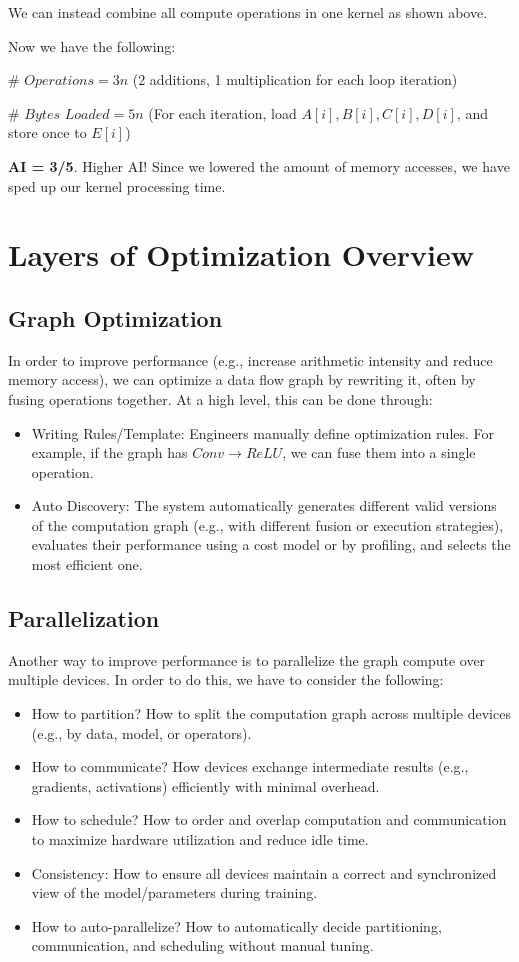 \documentclass[twoside]{article}
\begin{document}
We can instead combine all compute operations in one kernel as shown above. 

Now we have the following:

$\#$ $Operations = 3n$ (2 additions, 1 multiplication for each loop iteration) 

$\#$ $Bytes$ $Loaded = 5n$ (For each iteration, load $A[i], B[i], C[i], D[i]$, and store once to $E[i]$) 

\textbf{AI = 3/5}. Higher AI! Since we lowered the amount of memory accesses, we have sped up our kernel processing time.

\section{Layers of Optimization Overview}


\subsection{Graph Optimization}
In order to improve performance (e.g., increase arithmetic intensity and reduce memory access), we can optimize a data flow graph by rewriting it, often by fusing operations together. At a high level, this can be done through:
\begin{itemize}
    \item Writing Rules/Template: Engineers manually define optimization rules. For example, if the graph has $Conv \rightarrow ReLU$, we can fuse them into a single operation.
    \item Auto Discovery: The system automatically generates different valid versions of the computation graph (e.g., with different fusion or execution strategies), evaluates their performance using a cost model or by profiling, and selects the most efficient one.
\end{itemize}

\subsection{Parallelization}
Another way to improve performance is to parallelize the graph compute over multiple devices. In order to do this, we have to consider the following:
\begin{itemize}
    \item How to partition? How to split the computation graph across multiple devices (e.g., by data, model, or operators).
    \item How to communicate? How devices exchange intermediate results (e.g., gradients, activations) efficiently with minimal overhead.
    \item How to schedule? How to order and overlap computation and communication to maximize hardware utilization and reduce idle time.
    \item Consistency: How to ensure all devices maintain a correct and synchronized view of the model/parameters during training.
    \item How to auto-parallelize? How to automatically decide partitioning, communication, and scheduling without manual tuning.
\end{itemize}
\end{document}
